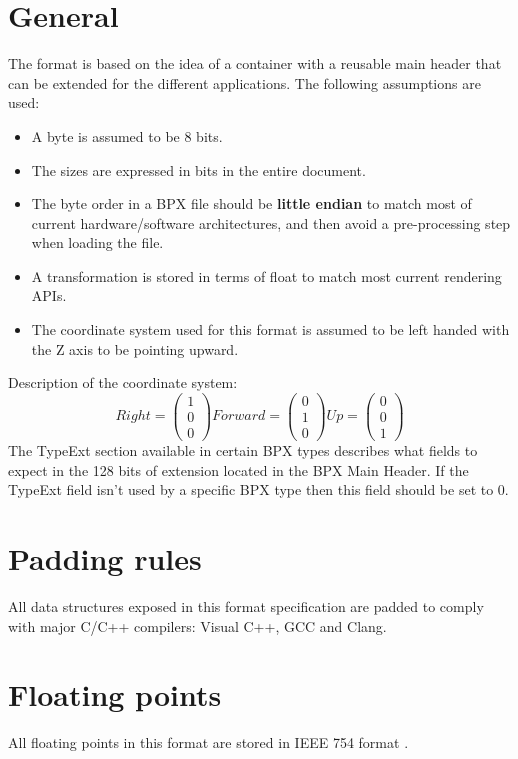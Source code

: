 \section{General}
The format is based on the idea of a container with a reusable main header that can be extended for the different applications.\newline
The following assumptions are used:
\begin{itemize}
    \item A byte is assumed to be 8 bits.
    \item The sizes are expressed in bits in the entire document.
    \item The byte order in a BPX file should be \textbf{little endian} to match most of current hardware/software architectures, and then avoid a pre-processing step when loading the file.
    \item A transformation is stored in terms of float to match most current rendering APIs.
    \item The coordinate system used for this format is assumed to be left handed with the Z axis to be pointing upward.
\end{itemize}
Description of the coordinate system:
\begin{equation}
    Right =
    \begin{pmatrix}
        1 \\
        0 \\
        0
    \end{pmatrix}
    Forward =
    \begin{pmatrix}
        0 \\
        1 \\
        0
    \end{pmatrix}
    Up =
    \begin{pmatrix}
        0 \\
        0 \\
        1
    \end{pmatrix}
\end{equation}
The TypeExt section available in certain BPX types describes what fields to expect in the 128 bits of extension located in the BPX Main Header.\newline
If the TypeExt field isn't used by a specific BPX type then this field should be set to 0.

\section{Padding rules}
All data structures exposed in this format specification are padded to comply with major C/C++ compilers: Visual C++, GCC and Clang.

\section{Floating points}
All floating points in this format are stored in IEEE 754 format \cite{ieee754}.